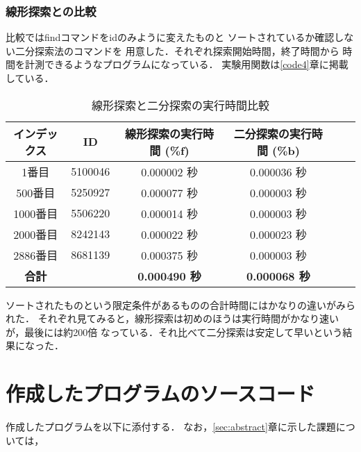     \subsubsection{線形探索との比較}
    比較ではfindコマンドをidのみように変えたものと
    ソートされているか確認しない二分探索法のコマンドを
    用意した．それぞれ探索開始時間，終了時間から
    時間を計測できるようなプログラムになっている．
    実験用関数は\ref{code4}章に掲載している．
    \begin{table}[h]
      \centering
      \begin{tabular}{|c|c|c|c|c|c|}
      \hline
      インデックス & ID & 線形探索の実行時間 (\%f) & 二分探索の実行時間 (\%b) \\ \hline
      1番目 & 5100046 & 0.000002 秒 & 0.000036 秒  \\ \hline
      500番目 & 5250927 & 0.000077 秒 & 0.000003 秒   \\ \hline
      1000番目 & 5506220 & 0.000014 秒 & 0.000003 秒  \\ \hline
      2000番目 & 8242143 & 0.000022 秒 & 0.000023 秒  \\ \hline
      2886番目 & 8681139 & 0.000375 秒 & 0.000003 秒 \\ \hline
      \textbf{合計} & & \textbf{0.000490 秒} & \textbf{0.000068 秒}  \\ \hline
      \end{tabular}
      \caption{線形探索と二分探索の実行時間比較}
      \end{table}
  ソートされたものという限定条件があるものの合計時間にはかなりの違いがみられた．
  それぞれ見てみると，線形探索は初めのほうは実行時間がかなり速いが，最後には約200倍
  なっている．それ比べて二分探索は安定して早いという結果になった．
  \clearpage


\section{作成したプログラムのソースコード}

作成したプログラムを以下に添付する．
なお，\ref{sec:abstract}章に示した課題については，

